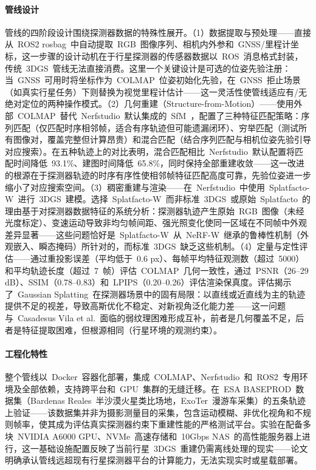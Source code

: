 \paragraph{管线设计}管线的四阶段设计围绕探测器数据的特殊性展开。（1）数据提取与预处理——直接从~ROS2 rosbag~中自动提取~RGB~图像序列、相机内外参和~GNSS/里程计坐标，这一步骤的设计动机在于行星探测器的传感器数据以~ROS~消息格式封装，传统~3DGS~管线无法直接消费。这里一个关键设计是可选的位姿先验注册：当~GNSS~可用时将坐标作为~COLMAP~位姿初始化先验，在~GNSS~拒止场景（如真实行星任务）下则替换为视觉里程计估计——这一灵活性使管线适应有/无绝对定位的两种操作模式。（2）几何重建（Structure-from-Motion）——使用外部~COLMAP~替代~Nerfstudio~默认集成的~SfM~，配置了三种特征匹配策略：序列匹配（仅匹配时序相邻帧，适合有序轨迹但可能遗漏闭环）、穷举匹配（测试所有图像对，覆盖完整但计算昂贵）和混合匹配（结合序列匹配与相机位姿先验引导对应搜索）。在五种轨迹上的对比表明，混合匹配相比~Nerfstudio~默认配置将匹配时间降低~93.1\%、建图时间降低~65.8\%，同时保持全部重建收敛——这一改进的根源在于探测器轨迹的时序有序性使相邻帧特征匹配高度可靠，先验位姿进一步缩小了对应搜索空间。（3）稠密重建与渲染——在~Nerfstudio~中使用~Splatfacto-W~进行~3DGS~建模。选择~Splatfacto-W~而非标准~3DGS~或原始~Splatfacto~的理由基于对探测器数据特征的系统分析：探测器轨迹产生原始~RGB~图像（未经光度标定）、变速运动导致非均匀帧间距、强光照变化使同一区域在不同帧中外观差异显著——这些问题恰好是~Splatfacto-W~从~NeRF-W~继承的鲁棒性机制（外观嵌入、瞬态掩码）所针对的，而标准~3DGS~缺乏这些机制。（4）定量与定性评估——通过重投影误差（平均低于~0.6 px）、每帧平均特征观测数（超过~5000）和平均轨迹长度（超过~7~帧）评估~COLMAP~几何一致性，通过~PSNR（26--29 dB）、SSIM（0.78--0.83）和~LPIPS（0.20--0.26）评估渲染保真度。评估揭示了~Gaussian Splatting~在探测器场景中的固有局限：以直线或近直线为主的轨迹提供不足的视差，导致高斯优化不稳定、对新视角泛化能力差——这一问题与~Casadesus Vila et al.~面临的弱纹理困难形成互补，前者是几何覆盖不足，后者是特征提取困难，但根源相同（行星环境的观测约束）。

\paragraph{工程化特性}整个管线以~Docker~容器化部署，集成~COLMAP、Nerfstudio~和~ROS2~专用环境及全部依赖，支持跨平台和~GPU~集群的无缝迁移。在~ESA BASEPROD~数据集（Bardenas Reales~半沙漠火星类比场地，ExoTer~漫游车采集）的五条轨迹上验证——该数据集并非为摄影测量目的采集，包含运动模糊、非优化视角和不规则帧率，使其成为评估真实探测器约束下重建性能的严格测试平台。实验在配备多块~NVIDIA A6000 GPU、NVMe~高速存储和~10Gbps NAS~的高性能服务器上进行，这一基础设施配置反映了当前行星~3DGS~重建仍需离线处理的现实——论文明确承认管线远超现有行星探测器平台的计算能力，无法实现实时或星载部署。

